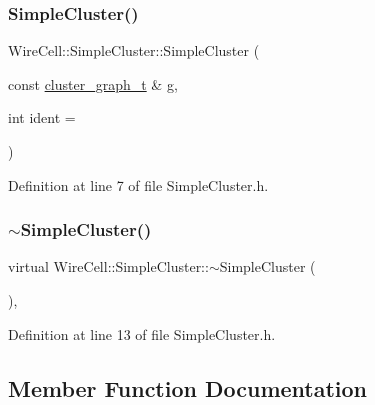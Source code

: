 \subsubsection{\texorpdfstring{Simple\+Cluster()}{SimpleCluster()}}
{\footnotesize\ttfamily Wire\+Cell\+::\+Simple\+Cluster\+::\+Simple\+Cluster (\begin{DoxyParamCaption}\item[{const \hyperlink{namespace_wire_cell_a6a9ecba14dfba50cdb081820a8bcacbe}{cluster\+\_\+graph\+\_\+t} \&}]{g,  }\item[{int}]{ident = {} }\end{DoxyParamCaption})\hspace{0.3cm}{\ttfamily [inline]}}



Definition at line 7 of file Simple\+Cluster.\+h.

\mbox{\label{class_wire_cell_1_1_simple_cluster_adaa76b013ba458a8dff10877d456fc6f}} 
\subsubsection{\texorpdfstring{$\sim$\+Simple\+Cluster()}{~SimpleCluster()}}
{\footnotesize\ttfamily virtual Wire\+Cell\+::\+Simple\+Cluster\+::$\sim$\+Simple\+Cluster (\begin{DoxyParamCaption}{ }\end{DoxyParamCaption})\hspace{0.3cm}{\ttfamily [inline]}, {\ttfamily [virtual]}}



Definition at line 13 of file Simple\+Cluster.\+h.



\subsection{Member Function Documentation}
\mbox{\label{class_wire_cell_1_1_simple_cluster_a0a501609a8aeb248675486855c3afb39}} 
